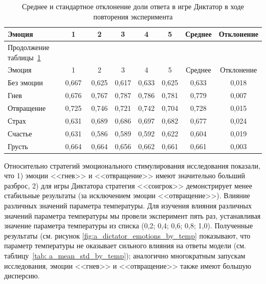 \begin{small}
\begin{longtable}[c]{|p{4.6cm}|c|c|c|c|c|c|c|}
\caption{Среднее и стандартное отклонение доли ответа в игре Диктатор в ходе повторения эксперимента}
\label{tab: a_mean_std_by_run} \\
    \hline
Эмоция & 1 & 2 & 3 &  4 &  5 & Среднее & Отклонение \\ \hline
    \endfirsthead   
    \multicolumn{2}{l}{\hspace{-2mm}\normalsize{Продолжение таблицы~\ref{tab: a_mean_std_by_run}}}        \\ %
\hline

Эмоция & 1 & 2 & 3 &  4 & 5& Среднее & Отклонение \\ \hline
    \endhead
    \endfoot        \hline
    \endlastfoot
Без эмоции  & 0,667  & 0,625  & 0,617  & 0,633  & 0,625  & 0,633 & 0,018  \\
           \hline
Гнев       & 0,676  & 0,767  & 0,787  & 0,786  & 0,781  & 0,779 & 0,007  \\
           \hline
Отвращение     & 0,725  & 0,746  & 0,721  & 0,742  & 0,704  & 0,728 & 0,015  \\
           \hline
Страх        & 0,631  & 0,689  & 0,686  & 0,697  & 0,682  & 0,677 & 0,024  \\
           \hline
Счастье   & 0,631  & 0,586  & 0,589  & 0,592  & 0,622  & 0,604 & 0,019  \\
           \hline
Грусть     & 0,664  & 0,664  & 0,656  & 0,662  & 0,661  & 0,661 & 0,003  \\
\hline
\end{longtable}
\end{small}


Относительно стратегий эмоционального стимулирования исследования показали, что 1) эмоции <<гнев>> и <<отвращение>> имеют значительно больший разброс, 2) для игры Диктатора стратегия <<соигрок>> демонстрирует менее стабильные результаты (за исключением эмоции <<отвращение>>).
Влияние различных значений параметра температуры. Для изучения влияния различных значений параметра температуры мы провели эксперимент пять раз, устанавливая значение параметра температуры из списка (0,2; 0,4; 0,6; 0,8; 1,0). Полученные результаты (см. рисунок \ref{fig:a_dictator_emotions_by_temp} показывают, что параметр температуры не оказывает сильного влияния на ответы модели (см. таблицу~\ref{tab: a_mean_std_by_temp}); аналогично многократным запускам исследования, эмоции <<гнев>> и <<отвращение>> также имеют большую дисперсию.

